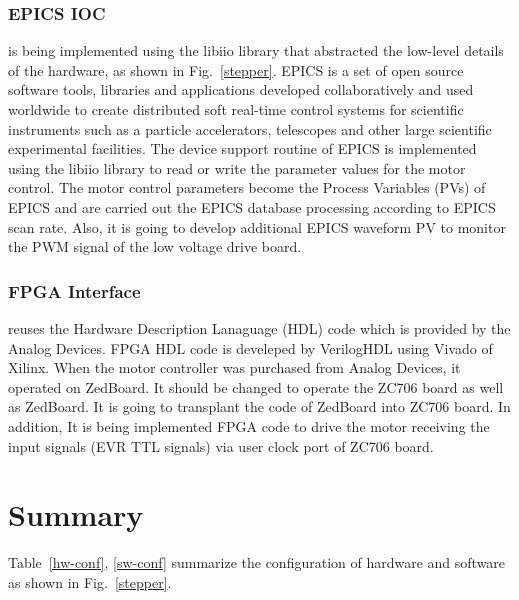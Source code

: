 \documentclass[a4paper,
              ]{jacow}
\begin{document}
\subsubsection{EPICS IOC} 
is being implemented using the libiio library that abstracted the low-level details of the hardware, as shown in Fig.~\ref{stepper}. EPICS is a set of open source software tools, libraries and applications developed collaboratively and used worldwide to create distributed soft real-time control systems for scientific instruments such as a particle accelerators, telescopes and other large scientific experimental facilities\cite{epics}.
The device support routine of EPICS is implemented using the libiio library to read or write the parameter values for the motor control. The motor control parameters become the Process Variables (PVs) of EPICS and are carried out the EPICS database processing according to EPICS scan rate. Also, it is going to develop additional EPICS waveform PV to monitor the PWM signal of the low voltage drive board.

\subsubsection{FPGA Interface}
reuses the Hardware Description Lanaguage (HDL) code which is provided by the Analog Devices. FPGA HDL code is develeped by VerilogHDL using Vivado of Xilinx. When the motor controller was purchased from Analog Devices, it operated on ZedBoard. It should be changed to operate the ZC706 board as well as ZedBoard. It is going to transplant the code of ZedBoard into ZC706 board. In addition, It is being implemented FPGA code to drive the motor receiving the input signals (EVR TTL signals) via user clock port of ZC706 board.


\section{Summary}

Table~\ref{hw-conf}, \ref{sw-conf} summarize the configuration of hardware and software as shown in Fig.~\ref{stepper}.
\end{document}
